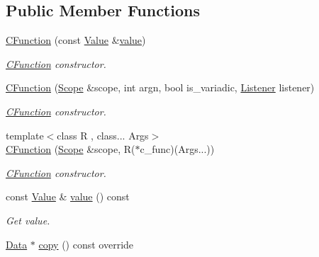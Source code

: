 \subsection*{Public Member Functions}
\begin{DoxyCompactItemize}
\item 
\hyperlink{classcreek_1_1_c_function_a32673b86d8b3a1d61cf544837ac1d2a2}{C\+Function} (const \hyperlink{classcreek_1_1_c_function_a6876be117b9faafce547d61b2e831131}{Value} \&\hyperlink{classcreek_1_1_c_function_a66d28f16e72a3b0cbbbe8e1d13162a60}{value})
\begin{DoxyCompactList}\small\item\em {\ttfamily \hyperlink{classcreek_1_1_c_function}{C\+Function}} constructor. \end{DoxyCompactList}\item 
\hyperlink{classcreek_1_1_c_function_ad83ee166c55220a6096eb968858394d1}{C\+Function} (\hyperlink{classcreek_1_1_scope}{Scope} \&scope, int argn, bool is\+\_\+variadic, \hyperlink{classcreek_1_1_c_function_a9499b5501ecc59d9ef8d892991c8fa16}{Listener} listener)
\begin{DoxyCompactList}\small\item\em {\ttfamily \hyperlink{classcreek_1_1_c_function}{C\+Function}} constructor. \end{DoxyCompactList}\item 
{\footnotesize template$<$class R , class... Args$>$ }\\\hyperlink{classcreek_1_1_c_function_acf8393305b9885bd2cdd71d6bddde2c3}{C\+Function} (\hyperlink{classcreek_1_1_scope}{Scope} \&scope, R($\ast$c\+\_\+func)(Args...))
\begin{DoxyCompactList}\small\item\em {\ttfamily \hyperlink{classcreek_1_1_c_function}{C\+Function}} constructor. \end{DoxyCompactList}\item 
const \hyperlink{classcreek_1_1_c_function_a6876be117b9faafce547d61b2e831131}{Value} \& \hyperlink{classcreek_1_1_c_function_a66d28f16e72a3b0cbbbe8e1d13162a60}{value} () const \hypertarget{classcreek_1_1_c_function_a66d28f16e72a3b0cbbbe8e1d13162a60}{}\label{classcreek_1_1_c_function_a66d28f16e72a3b0cbbbe8e1d13162a60}

\begin{DoxyCompactList}\small\item\em Get value. \end{DoxyCompactList}\item 
\hyperlink{classcreek_1_1_data}{Data} $\ast$ \hyperlink{classcreek_1_1_c_function_aa813029453ea8b6a1aa824d7aff5610d}{copy} () const  override\hypertarget{classcreek_1_1_c_function_aa813029453ea8b6a1aa824d7aff5610d}{}\label{classcreek_1_1_c_function_aa813029453ea8b6a1aa824d7aff5610d}


\end{DoxyCompactItemize}
